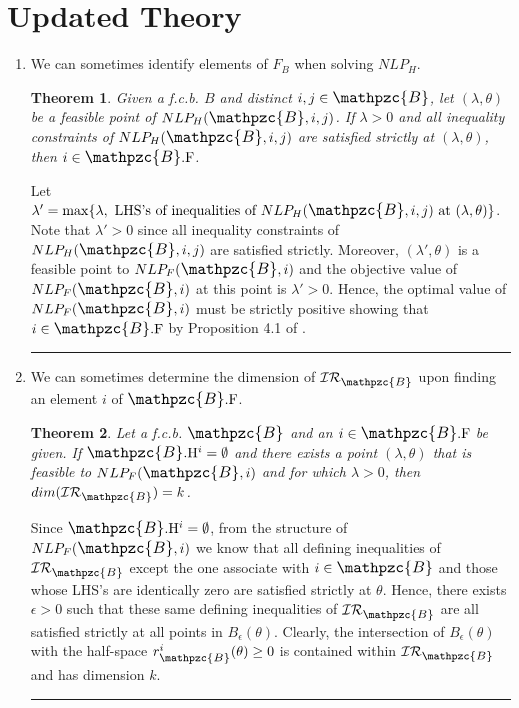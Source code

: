 \documentclass[11pt]{article}
\newtheorem{theorem}{Theorem}
\newenvironment{proof}{{\bf Proof:}}{\hfill\rule{2mm}{2mm}}
\newcommand{\B}{\mathbin{\ThisStyle{\scalebox{1.15}{$\SavedStyle\ensuremath{\mathpzc{B}}$}}}}
\newcommand{\F}{\mathrm{F}}
\newcommand{\Hh}{\mathrm{H}}
\newcommand{\IR}{\mathcal{IR}}
\newcommand{\contains}[2]{#1.\Hh^{#2}}
\newcommand{\facets}[1]{#1.\F}
\newcommand{\invRgn}[1]{\IR_{#1}}
\newcommand{\constraint}[3]{r_{#1}^{#2}(#3)}
\begin{document}
\section{Updated Theory}

\begin{enumerate}
\item We can sometimes identify elements of $F_B$ when solving $NLP_H$.
\begin{theorem}
Given a f.c.b. $B$ and distinct $i,j \in \B$, let $(\lambda, \theta)$ be a feasible point of $NLP_H(\B,i,j)$. If $\lambda > 0$ and all inequality constraints of $NLP_H(\B,i,j)$ are satisfied strictly at $(\lambda, \theta)$, then $i \in \facets{\B}$.
\end{theorem}
\begin{proof}
Let $\lambda' = \max\{\lambda, \text{ LHS's of inequalities of } NLP_H(\B,i,j) \text{ at } (\lambda, \theta)\}$. Note that $\lambda' > 0$ since all inequality constraints of $NLP_H(\B,i,j)$ are satisfied strictly. Moreover, $(\lambda', \theta)$ is a feasible point to $NLP_F(\B,i)$ and the objective value of $NLP_F(\B,i)$ at this point is $\lambda' > 0$. Hence, the optimal value of $NLP_F(\B,i)$ must be strictly positive showing that $i \in \facets{\B}$ by Proposition 4.1 of \citep{adelgren2021advancing}.
\end{proof}

\item We can sometimes determine the dimension of $\invRgn{\B}$ upon finding an element $i$ of $\facets{\B}$.
\begin{theorem}
Let a f.c.b. $\B$ and an $i \in \facets{\B}$ be given. If $\contains{\B}{i} = \emptyset$ and there exists a point $(\lambda, \theta)$ that is feasible to $NLP_F(\B,i)$ and for which $\lambda > 0$, then $dim(\invRgn{\B}) = k$. 
\end{theorem}
\begin{proof}
Since $\contains{\B}{i} = \emptyset$, from the structure of $NLP_F(\B,i)$ we know that all defining inequalities of $\invRgn{\B}$ except the one associate with $i \in \B$ and those whose LHS's are identically zero are satisfied strictly at $\theta$. Hence, there exists $\epsilon > 0$ such that these same defining inequalities of $\invRgn{\B}$ are all satisfied strictly at all points in $B_\epsilon(\theta)$. Clearly, the intersection of $B_\epsilon(\theta)$ with the half-space $\constraint{\B}{i}{\theta} \geq 0$ is contained within $\invRgn{\B}$ and has dimension $k$.
\end{proof}


\end{enumerate}
\end{document}
